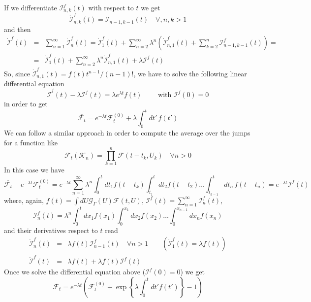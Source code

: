 \documentclass[12pt]{iopart}
\newcommand{\lx} {\left}
\newcommand{\rx} {\right}
\newcommand{\cG} {\mathcal{G}}
\newcommand{\cI} {\mathcal{I}}
\newcommand{\cK} {\mathcal{K}}
\newcommand{\cF} {\mathcal{F}}
\begin{document}
If we differentiate $\cI^f_{n,k}(t)$ with respect to $t$ we get
\begin{equation}
\dot{\cI}^f_{n,k}(t)=\cI_{n-1,k-1}(t) \quad \forall, n,k>1
\end{equation}
and then
\begin{eqnarray}
    \dot{\cI}^f(t) &=& \sum_{n=1}^\infty \dot{\cI}^f_n(t) =  \dot{\cI}^f_1(t) + \sum_{n=2}^\infty \lambda^n \lx(\dot{\cI}^f_{n,1}(t) + \sum_{k=2}^n \cI^f_{n-1,k-1}(t)\rx) = \nonumber\\
    &=& \dot{\cI}^f_1(t) + \sum_{n=2}^\infty \lambda^n \dot{\cI}^f_{n,1}(t) + \lambda \cI^f(t) 
\end{eqnarray}
So, since $\dot{\cI}^f_{n,1}(t) = f(t) t^{n-1}/(n-1)!$, we have to solve the following linear differential equation
\begin{equation}
    \dot{\cI}^f(t) -\lambda \cI^f(t) = \lambda e^{\lambda t} f(t) \qquad \text { with } \cI^f(0) = 0
\end{equation}
in order to get
\begin{equation}
\overline{\cF_t} = e^{-\lambda t}\cF^{(0)}_t + \lambda \int_0^t dt'\, f(t')
\label{avejumpsum}
\end{equation}
We can follow a similar approach in order to compute the average over the jumps for a function like
\begin{equation}
    \cF_t(\cK_n) = \prod_{k=1}^n \cF(t-t_k, U_k) \quad \forall n > 0
\end{equation}
In this case we have
\begin{equation}
 \overline{\cF_t} - e^{-\lambda t}\cF^{(0)}_t = e^{-\lambda t} \sum_{n=1}^\infty \lambda^n \int_0^t d t_1 f(t-t_k) \int_{t_1}^t d t_2 f(t-t_2) \dots \int_{t_{k-1}}^t d t_n\, f(t-t_n) = e^{-\lambda t} \cI^f(t)
\end{equation}
where, again, $f(t) = \int dU \cG_{\Gamma}(U) \cF(t,U)$, $\cI^f(t)=\sum_{n=1}^\infty \cI^f_n(t)$, 
\begin{equation}
\cI^f_n(t) = \lambda^n \int_0^t dx_1 f(x_1) \int_0^{x_1} dx_2 f(x_2) \dots  \int_0^{x_{n-1}} dx_n f(x_n)\end{equation}
and their derivatives respect to $t$ read
\begin{eqnarray}
\dot{\cI}^f_n(t) &=& \lambda f(t) \cI^f_{n-1}(t) \quad \forall n>1 \qquad \lx(\dot{\cI}^f_1(t) = \lambda f(t)\rx)\\
\dot{\cI}^f(t) &=& \lambda f(t) + \lambda f(t) \cI^f(t)
\end{eqnarray}
Once we solve the differential equation above ($\cI^f(0)=0$) we get
\begin{equation}
    \overline{\cF_t} = e^{-\lambda t} \lx(\cF^{(0)}_t + \exp\lx\{\lambda \int_0^t dt' f(t')\rx\} - 1\rx)
\label{avejumppro}
\end{equation}
\end{document}
